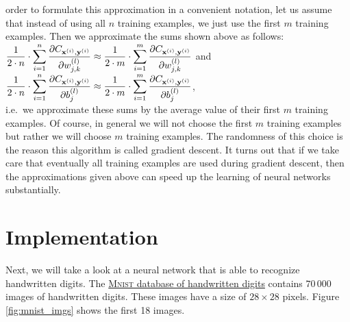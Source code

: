 order to formulate this approximation in a convenient notation, let us assume that instead of using all $n$
training examples, we just use the first $m$ training examples.  Then we approximate the sums shown above as follows:
\\[0.2cm]
\hspace*{1.3cm}
$\displaystyle \frac{1}{2\cdot n} \cdot \sum\limits_{i=1}^n \frac{\partial C_{\mathbf{x}^{(i)}, \mathbf{y}^{(i)}}}{\partial w_{j,k}^{(l)}}
 \approx
 \frac{1}{2\cdot m} \cdot \sum\limits_{i=1}^m \frac{\partial C_{\mathbf{x}^{(i)}, \mathbf{y}^{(i)}}}{\partial w_{j,k}^{(l)}}
$
\quad and \quad
$\displaystyle \frac{1}{2\cdot n} \cdot \sum\limits_{i=1}^n \frac{\partial C_{\mathbf{x}^{(i)}, \mathbf{y}^{(i)}}}{\partial b_{j}^{(l)}}
     \approx
     \frac{1}{2\cdot m} \cdot \sum\limits_{i=1}^m \frac{\partial C_{\mathbf{x}^{(i)}, \mathbf{y}^{(i)}}}{\partial b_{j}^{(l)}}
$,
\\[0.2cm]
i.e.~we approximate these sums by the average value of their first $m$ training examples.
Of course, in general we will not choose the first $m$ training examples but rather we will choose $m$ 
training examples.  The randomness of this choice is the reason this algorithm is called 
gradient descent.  It turns out that if we take care that eventually all training examples are used during
gradient descent, then the approximations given above can speed up the learning of neural networks substantially.

\section{Implementation}
Next, we will take a look at a neural network that is able to recognize handwritten digits.  The
\href{http://yann.lecun.com/exdb/mnist/}{\textsc{Mnist} database of handwritten digits}
contains $70\,000$ images of handwritten digits. These images have a size of $28 \times 28$ pixels.
Figure \ref{fig:mnist_imgs} shows the first 18 images. 

